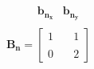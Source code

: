 \documentclass[preview]{standalone}
\begin{document}
\begin{align*}
\begin{array}{cc}\begin{matrix}\hspace{1cm} \mathbf{b_{n_x}}  & \mathbf{b_{n_y}} \end{matrix} \\ \mathbf{B_n} = \begin{bmatrix} 1 & \quad 1 \\ \\0 &  \quad 2 \end{bmatrix} \end{array}
\end{align*}
\end{document}
